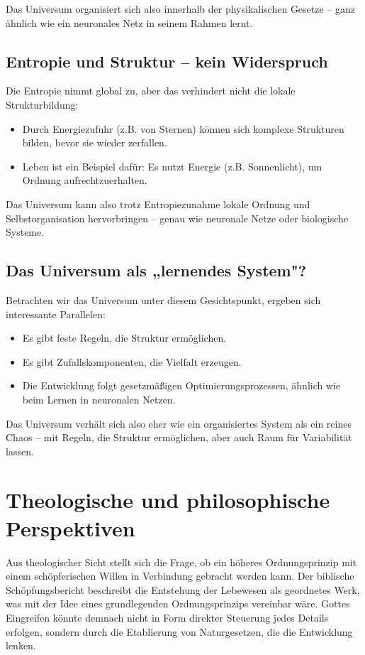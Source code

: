 \documentclass{article}
\begin{document}
	Das Universum organisiert sich also innerhalb der physikalischen Gesetze – ganz ähnlich wie ein neuronales Netz in seinem Rahmen lernt.
	
	\subsection{Entropie und Struktur – kein Widerspruch}
	Die Entropie nimmt global zu, aber das verhindert nicht die lokale Strukturbildung:
	
	\begin{itemize}
		\item Durch Energiezufuhr (z.B. von Sternen) können sich komplexe Strukturen bilden, bevor sie wieder zerfallen.
		\item Leben ist ein Beispiel dafür: Es nutzt Energie (z.B. Sonnenlicht), um Ordnung aufrechtzuerhalten.
	\end{itemize}
	
	Das Universum kann also trotz Entropiezunahme lokale Ordnung und Selbstorganisation hervorbringen – genau wie neuronale Netze oder biologische Systeme.
	
	\subsection{Das Universum als „lernendes System"?}
	Betrachten wir das Universum unter diesem Gesichtspunkt, ergeben sich interessante Parallelen:
	
	\begin{itemize}
		\item Es gibt feste Regeln, die Struktur ermöglichen.
		\item Es gibt Zufallskomponenten, die Vielfalt erzeugen.
		\item Die Entwicklung folgt gesetzmäßigen Optimierungsprozessen, ähnlich wie beim Lernen in neuronalen Netzen.
	\end{itemize}
	
	Das Universum verhält sich also eher wie ein organisiertes System als ein reines Chaos – mit Regeln, die Struktur ermöglichen, aber auch Raum für Variabilität lassen.
	
	\section{Theologische und philosophische Perspektiven}
	Aus theologischer Sicht stellt sich die Frage, ob ein höheres Ordnungsprinzip mit einem schöpferischen Willen in Verbindung gebracht werden kann. Der biblische Schöpfungsbericht beschreibt die Entstehung der Lebewesen als geordnetes Werk, was mit der Idee eines grundlegenden Ordnungsprinzips vereinbar wäre. Gottes Eingreifen könnte demnach nicht in Form direkter Steuerung jedes Details erfolgen, sondern durch die Etablierung von Naturgesetzen, die die Entwicklung lenken.
	
\end{document}
